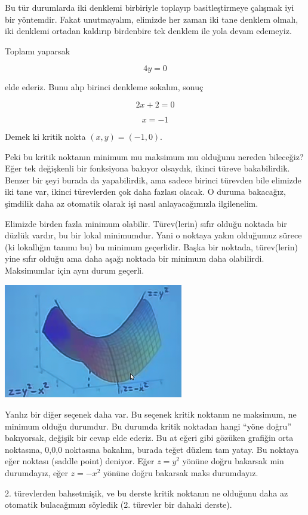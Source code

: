 \documentclass[12pt,fleqn]{article}\usepackage{../../common}
\begin{document}
Bu tür durumlarda iki denklemi birbiriyle toplayıp basitleştirmeye çalışmak iyi
bir yöntemdir. Fakat unutmayalım, elimizde her zaman iki tane denklem olmalı,
iki denklemi ortadan kaldırıp birdenbire tek denklem ile yola devam edemeyiz.

Toplamı yaparsak

$$ 4y = 0 $$

elde ederiz. Bunu alıp birinci denkleme sokalım, sonuç

$$ 2x + 2 = 0 $$

$$ x = -1 $$

Demek ki kritik nokta $(x,y) = (-1,0)$. 

Peki bu kritik noktanın minimum mu maksimum mu olduğunu nereden bileceğiz?  Eğer
tek değişkenli bir fonksiyona bakıyor olsaydık, ikinci türeve
bakabilirdik. Benzer bir şeyi burada da yapabilirdik, ama sadece birinci
türevden bile elimizde iki tane var, ikinci türevlerden çok daha fazlası
olacak. O duruma bakacağız, şimdilik daha az otomatik olarak işi nasıl
anlayacağımızla ilgilenelim.

Elimizde birden fazla minimum olabilir. Türev(lerin) sıfır olduğu noktada bir
düzlük vardır, bu bir lokal minimumdur. Yani o noktaya yakın olduğumuz sürece
(ki lokallığın tanımı bu) bu minimum geçerlidir. Başka bir noktada, türev(lerin)
yine sıfır olduğu ama daha aşağı noktada bir minimum daha
olabilirdi. Maksimumlar için aynı durum geçerli.

\includegraphics[height=5cm]{9_4.png}

Yanlız bir diğer seçenek daha var. Bu seçenek kritik noktanın ne maksimum, ne
minimum olduğu durumdur. Bu durumda kritik noktadan hangi ``yöne doğru''
bakıyorsak, değişik bir cevap elde ederiz. Bu at eğeri gibi gözüken grafiğin
orta noktasına, 0,0,0 noktasına bakalım, burada teğet düzlem tam yatay. Bu
noktaya eğer noktası (saddle point) deniyor. Eğer $z=y^2$ yönüne doğru bakarsak
min durumdayız, eğer $z=-x^2$ yönüne doğru bakarsak maks durumdayız.

2. türevlerden bahsetmişik, ve bu derste kritik noktanın ne olduğunu daha
az otomatik bulacağımızı söyledik (2. türevler bir dahaki derste). 
\end{document}
